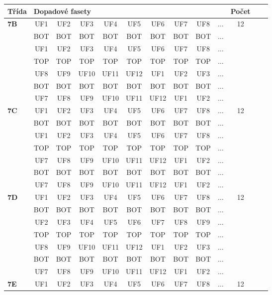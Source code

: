 \begin{table}[h!]
\centering
\begin{tabular}{|l|c|c|c|c|c|c|c|c|c|c|c|c|}
\hline
Třída &  \multicolumn{9}{l}{Dopadové fasety} \vline  & Počet\\
\hline \hline
\textbf{7B} & UF1 & UF2 & UF3 & UF4 & UF5 & UF6 & UF7 & UF8 & $\dots$ & 12\\
 & BOT & BOT & BOT & BOT & BOT & BOT & BOT & BOT & $\dots$ & \\
 & UF1 & UF2 & UF3 & UF4 & UF5 & UF6 & UF7 & UF8 & $\dots$ & \\
 & TOP & TOP & TOP & TOP & TOP & TOP & TOP & TOP & $\dots$ & \\
 & UF8 & UF9 & UF10 & UF11 & UF12 & UF1 & UF2 & UF3 & $\dots$ & \\
 & BOT & BOT & BOT & BOT & BOT & BOT & BOT & BOT & $\dots$ & \\
 & UF7 & UF8 & UF9 & UF10 & UF11 & UF12 & UF1 & UF2 & $\dots$ & \\
\hline \hline
\textbf{7C} & UF1 & UF2 & UF3 & UF4 & UF5 & UF6 & UF7 & UF8 & $\dots$ & 12\\
 & BOT & BOT & BOT & BOT & BOT & BOT & BOT & BOT & $\dots$ & \\
 & UF1 & UF2 & UF3 & UF4 & UF5 & UF6 & UF7 & UF8 & $\dots$ & \\
 & TOP & TOP & TOP & TOP & TOP & TOP & TOP & TOP & $\dots$ & \\
 & UF7 & UF8 & UF9 & UF10 & UF11 & UF12 & UF1 & UF2 & $\dots$ & \\
 & BOT & BOT & BOT & BOT & BOT & BOT & BOT & BOT & $\dots$ & \\
 & UF7 & UF8 & UF9 & UF10 & UF11 & UF12 & UF1 & UF2 & $\dots$ & \\
\hline \hline
\textbf{7D} & UF1 & UF2 & UF3 & UF4 & UF5 & UF6 & UF7 & UF8 & $\dots$ & 12\\
 & BOT & BOT & BOT & BOT & BOT & BOT & BOT & BOT & $\dots$ & \\
 & UF2 & UF3 & UF4 & UF5 & UF6 & UF7 & UF8 & UF9 & $\dots$ & \\
 & TOP & TOP & TOP & TOP & TOP & TOP & TOP & TOP & $\dots$ & \\
 & UF8 & UF9 & UF10 & UF11 & UF12 & UF1 & UF2 & UF3 & $\dots$ & \\
 & BOT & BOT & BOT & BOT & BOT & BOT & BOT & BOT & $\dots$ & \\
 & UF7 & UF8 & UF9 & UF10 & UF11 & UF12 & UF1 & UF2 & $\dots$ & \\
\hline \hline
\textbf{7E} & UF1 & UF2 & UF3 & UF4 & UF5 & UF6 & UF7 & UF8 & $\dots$ & 12\\

\end{tabular}
\end{table}
